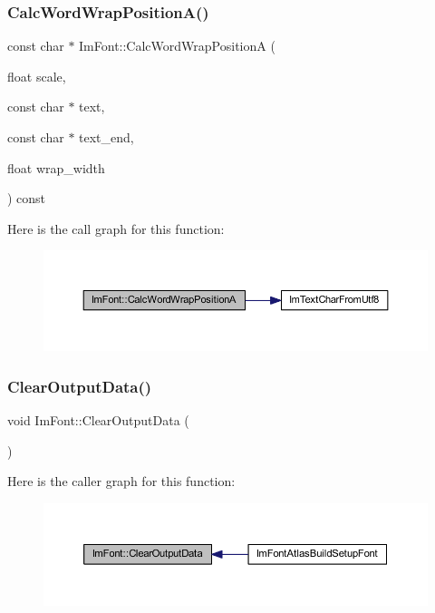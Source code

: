 \subsubsection{\texorpdfstring{Calc\+Word\+Wrap\+Position\+A()}{CalcWordWrapPositionA()}}
{\footnotesize\ttfamily const char $\ast$ Im\+Font\+::\+Calc\+Word\+Wrap\+PositionA (\begin{DoxyParamCaption}\item[{float}]{scale,  }\item[{const char $\ast$}]{text,  }\item[{const char $\ast$}]{text\+\_\+end,  }\item[{float}]{wrap\+\_\+width }\end{DoxyParamCaption}) const}

Here is the call graph for this function\+:
\nopagebreak
\begin{figure}[H]
\begin{center}
\leavevmode
\includegraphics[width=350pt]{struct_im_font_a3781bb82a1ceba919cb6c98a398c7a67_cgraph}
\end{center}
\end{figure}
\mbox{\label{struct_im_font_aecf7773b1c40b433f91ee245f463de12}} 
\subsubsection{\texorpdfstring{Clear\+Output\+Data()}{ClearOutputData()}}
{\footnotesize\ttfamily void Im\+Font\+::\+Clear\+Output\+Data (\begin{DoxyParamCaption}{ }\end{DoxyParamCaption})}

Here is the caller graph for this function\+:
\nopagebreak
\begin{figure}[H]
\begin{center}
\leavevmode
\includegraphics[width=350pt]{struct_im_font_aecf7773b1c40b433f91ee245f463de12_icgraph}
\end{center}
\end{figure}
\mbox{\label{struct_im_font_ac6a773b73c6406fd8f08c4c93213a501}} 
